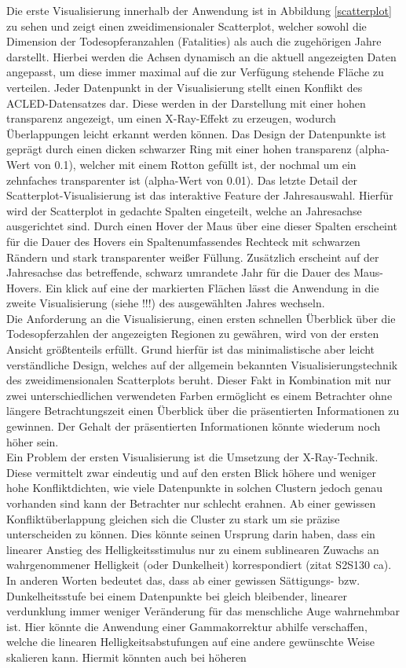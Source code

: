 \documentclass[usegeometry=true]{scrartcl}
\begin{document}
Die erste Visualisierung innerhalb der Anwendung ist in Abbildung \ref{scatterplot} zu sehen und zeigt einen zweidimensionaler Scatterplot, welcher sowohl die Dimension der Todesopferanzahlen (\glqq Fatalities\grqq{}) als auch die zugehörigen Jahre darstellt. Hierbei werden die Achsen dynamisch an die aktuell angezeigten Daten angepasst, um diese immer maximal auf die zur Verfügung stehende Fläche zu verteilen. Jeder Datenpunkt in der Visualisierung stellt einen Konflikt des ACLED-Datensatzes dar. Diese werden in der Darstellung mit einer hohen transparenz angezeigt, um einen X-Ray-Effekt zu erzeugen, wodurch Überlappungen leicht erkannt werden können. Das Design der Datenpunkte ist geprägt durch einen dicken schwarzer Ring mit einer hohen transparenz (alpha-Wert von 0.1), welcher mit einem Rotton gefüllt ist, der nochmal um ein zehnfaches transparenter ist (alpha-Wert von 0.01). Das letzte Detail der Scatterplot-Visualisierung ist das interaktive Feature der Jahresauswahl. Hierfür wird der Scatterplot in gedachte Spalten eingeteilt, welche an Jahresachse ausgerichtet sind. Durch einen Hover der Maus über eine dieser Spalten erscheint für die Dauer des Hovers ein Spaltenumfassendes Rechteck mit schwarzen Rändern und stark transparenter weißer Füllung. Zusätzlich erscheint auf der Jahresachse das betreffende, schwarz umrandete Jahr für die Dauer des Maus-Hovers. Ein klick auf eine der markierten Flächen lässt die Anwendung in die zweite Visualisierung (siehe !!!) des ausgewählten Jahres wechseln.\\ Die Anforderung an die Visualisierung, einen ersten schnellen Überblick über die Todesopferzahlen der angezeigten Regionen zu gewähren, wird von der ersten Ansicht größtenteils erfüllt. Grund hierfür ist das minimalistische aber leicht verständliche Design, welches auf der allgemein bekannten Visualisierungstechnik des zweidimensionalen Scatterplots beruht. Dieser Fakt in Kombination mit nur zwei unterschiedlichen verwendeten Farben ermöglicht es einem Betrachter ohne längere Betrachtungszeit einen Überblick über die präsentierten Informationen zu gewinnen. Der Gehalt der präsentierten Informationen könnte wiederum noch höher sein.\\ Ein Problem der ersten Visualisierung ist die Umsetzung der X-Ray-Technik. Diese vermittelt zwar eindeutig und auf den ersten Blick höhere und weniger hohe Konfliktdichten, wie viele Datenpunkte in solchen Clustern jedoch genau vorhanden sind kann der Betrachter nur schlecht erahnen. Ab einer gewissen Konfliktüberlappung gleichen sich die Cluster zu stark um sie präzise unterscheiden zu können. Dies könnte seinen Ursprung darin haben, dass ein linearer Anstieg des Helligkeitsstimulus nur zu einem sublinearen Zuwachs an wahrgenommener Helligkeit (oder Dunkelheit) korrespondiert (zitat S2S130 ca). In anderen Worten bedeutet das, dass ab einer gewissen Sättigungs- bzw. \glqq Dunkelheitsstufe\grqq{} bei einem Datenpunkte bei gleich bleibender, linearer verdunklung immer weniger Veränderung für das menschliche Auge wahrnehmbar ist. Hier könnte die Anwendung einer Gammakorrektur abhilfe verschaffen, welche die linearen Helligkeitsabstufungen auf eine andere gewünschte Weise skalieren kann. Hiermit könnten auch bei höheren 
\end{document}
